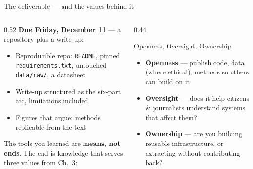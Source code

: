 \documentclass[9pt,aspectratio=169]{beamer}
\begin{document}
\begin{frame}{The deliverable --- and the values behind it}
    \begin{columns}[T]
        \begin{column}{0.52\textwidth}
            \textbf{Due Friday, December 11} --- a repository plus a write-up:
            \begin{itemize}\small
                \item Reproducible repo: \texttt{README}, pinned \texttt{requirements.txt}, untouched \texttt{data/raw/}, a datasheet
                \item Write-up structured as the six-part arc, limitations included
                \item Figures that argue; methods replicable from the text
            \end{itemize}

            \vspace{0.5em}

            The tools you learned are \textbf{means, not ends}. The end is knowledge that serves three values from Ch.~3:
        \end{column}
        \begin{column}{0.44\textwidth}
            \begin{block}{Openness, Oversight, Ownership}
                \footnotesize
                \begin{itemize}\footnotesize
                    \item \textbf{Openness} --- publish code, data (where ethical), methods so others can build on it
                    \item \textbf{Oversight} --- does it help citizens \& journalists understand systems that affect them?
                    \item \textbf{Ownership} --- are you building reusable infrastructure, or extracting without contributing back?
                \end{itemize}
            \end{block}
        \end{column}
    \end{columns}
\end{frame}
\end{document}
